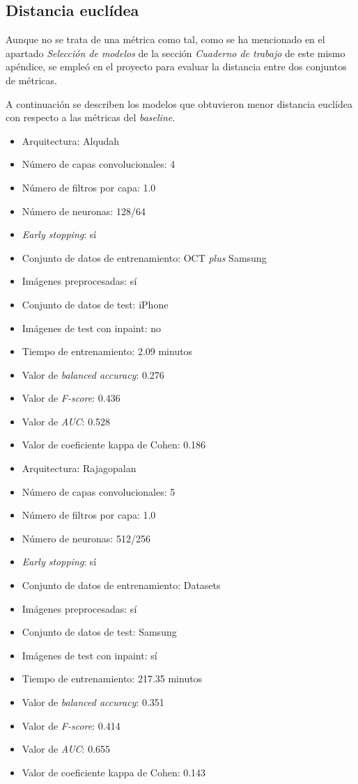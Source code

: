 \subsection{Distancia euclídea}

Aunque no se trata de una métrica como tal, como se ha mencionado en el apartado \textit{Selección de modelos} de la sección \textit{Cuaderno de trabajo} de este mismo apéndice, se empleó en el proyecto para evaluar la distancia entre dos conjuntos de métricas.

A continuación se describen los modelos que obtuvieron menor distancia euclídea con respecto a las métricas del \textit{baseline}.

\begin{itemize}
    \item Arquitectura: Alqudah
    \item Número de capas convolucionales: 4
    \item Número de filtros por capa: 1.0
    \item Número de neuronas: 128/64
    \item \textit{Early stopping}: sí
    \item Conjunto de datos de entrenamiento: OCT \textit{plus} Samsung
    \item Imágenes preprocesadas: sí
    \item Conjunto de datos de test: iPhone
    \item Imágenes de test con inpaint: no
    \item Tiempo de entrenamiento: 2.09 minutos
    \item Valor de \textit{balanced accuracy}: 0.276
    \item Valor de \textit{F-score}: 0.436
    \item Valor de \textit{AUC}: 0.528
    \item Valor de coeficiente kappa de Cohen: 0.186
\end{itemize}

\begin{itemize}
    \item Arquitectura: Rajagopalan
    \item Número de capas convolucionales: 5
    \item Número de filtros por capa: 1.0
    \item Número de neuronas: 512/256
    \item \textit{Early stopping}: sí
    \item Conjunto de datos de entrenamiento: Datasets
    \item Imágenes preprocesadas: sí
    \item Conjunto de datos de test: Samsung
    \item Imágenes de test con inpaint: sí
    \item Tiempo de entrenamiento: 217.35 minutos
    \item Valor de \textit{balanced accuracy}: 0.351
    \item Valor de \textit{F-score}: 0.414
    \item Valor de \textit{AUC}: 0.655
    \item Valor de coeficiente kappa de Cohen: 0.143
\end{itemize}